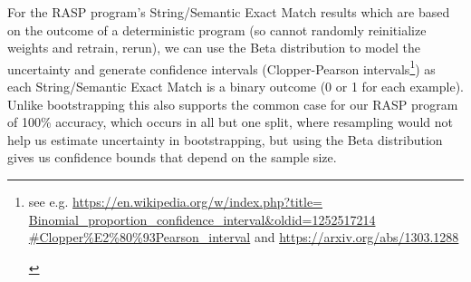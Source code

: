 \documentclass[11pt]{article}
\begin{document}
For the RASP program's String/Semantic Exact Match results which are based on the outcome of a deterministic program (so cannot randomly reinitialize weights and retrain, rerun),
we can use the Beta distribution to model the uncertainty and generate confidence intervals (Clopper-Pearson intervals\footnote{\begin{footnotesize}see e.g. \href{https://en.wikipedia.org/w/index.php?title=Binomial\_proportion\_confidence\_interval\&oldid=1252517214\#Clopper\%E2\%80\%93Pearson\_interval}{https://en.wikipedia.org/w/index.php?title=
Binomial\_proportion\_confidence\_interval\&oldid=1252517214
\#Clopper\%E2\%80\%93Pearson\_interval}
and
\href{https://arxiv.org/abs/1303.1288}{https://arxiv.org/abs/1303.1288} 
\end{footnotesize}
}) as each String/Semantic Exact Match is a binary outcome (0 or 1 for each example). Unlike bootstrapping this also supports the common case for our RASP program of 100\% accuracy, which occurs in all but one split, where resampling would not help us estimate uncertainty in bootstrapping, but using the Beta distribution gives us confidence bounds that depend on the sample size.
\end{document}
